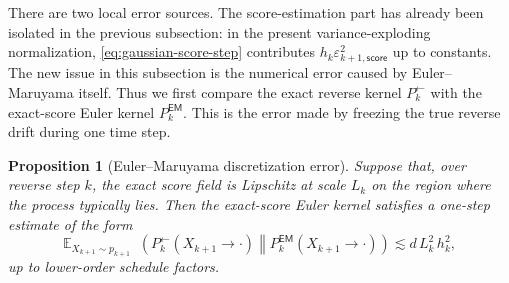 \documentclass[10pt,a4paper]{amsart}
\numberwithin{equation}{section}
\newtheorem{prop}[theorem]{Proposition}
\DeclareMathOperator{\KL}{D_{\mathsf{KL}}}
\newcommand{\E}{\mathbb{E}}
\newcommand{\eps}{\varepsilon}
\begin{document}
There are two local error sources.  The score-estimation part has already been
isolated in the previous subsection: in the present variance-exploding
normalization, \eqref{eq:gaussian-score-step} contributes
$h_k\eps_{k+1,\mathsf{score}}^2$ up to constants.  The new issue in this
subsection is the numerical error caused by Euler--Maruyama itself.  Thus we
first compare the exact reverse kernel $P_k^{\leftarrow}$ with the exact-score
Euler kernel $P_k^{\mathsf{EM}}$.  This is the error made by freezing the true
reverse drift during one time step.

\begin{prop}[Euler--Maruyama discretization error]
\label{prop:em-local-error}
Suppose that, over reverse step $k$, the exact score field is Lipschitz at
scale $L_k$ on the region where the process typically lies.  Then the
exact-score Euler kernel satisfies a one-step estimate of the form
\[
    \E_{X_{k+1}\sim p_{k+1}}
    \KL\!\left(
        P_k^{\leftarrow}(X_{k+1} \to \cdot)
        \middle\|
        P_k^{\mathsf{EM}}(X_{k+1} \to \cdot)
    \right)
    \lesssim
    d\,L_k^2\,h_k^2,
\]
up to lower-order schedule factors.
\end{prop}
\end{document}
